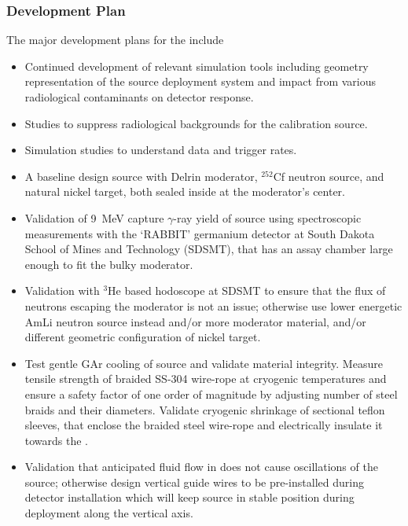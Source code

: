 \subsubsection{Development Plan}
The major development plans for the  include
\begin{itemize}
\item Continued development of relevant simulation tools including geometry representation of the source deployment system and impact from various radiological contaminants on detector response. 
\item Studies to suppress radiological backgrounds for the calibration source.
\item Simulation studies to understand data and trigger rates.
\item A baseline design source with Delrin moderator, $^{252}$Cf neutron source, and natural nickel target, both sealed inside at the moderator's center.
\item Validation of \SI{9}{\MeV} capture $\gamma$-ray yield of source using spectroscopic measurements with the `RABBIT' germanium detector at South Dakota School of Mines and Technology (SDSMT), that has an assay chamber large enough to fit the bulky moderator. 
\item Validation with $^{3}$He based hodoscope at SDSMT to ensure that the flux of neutrons escaping the moderator is not an issue; otherwise use lower energetic AmLi neutron source instead and/or more moderator material, and/or different geometric configuration of nickel target. 
\item Test gentle GAr cooling of source and validate material integrity. Measure tensile strength of braided SS-304 wire-rope at cryogenic temperatures and ensure a safety factor of one order of magnitude by adjusting number of steel braids and their diameters. Validate cryogenic shrinkage of sectional teflon sleeves, that enclose the braided steel wire-rope and electrically insulate it towards the . 
\item Validation that anticipated fluid flow in  does not cause oscillations of the source; otherwise design vertical guide wires to be pre-installed during detector installation 
which will keep source in stable position during deployment along the vertical axis.

\end{itemize}

